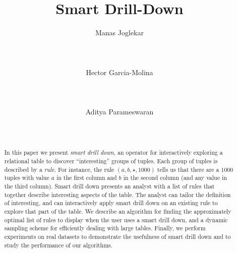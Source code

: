 \documentclass{vldb}
\newcommand{\techreporttext}[1]{}
\begin{document}
\title{Smart Drill-Down}
\author{
\alignauthor
Manas Joglekar\\
       \\
       \\
	   \\
\alignauthor
Hector Garcia-Molina\\
       \\
       \\
	   \\
\alignauthor 
Aditya Parameswaran\\
       \\
       \\
}
\maketitle

\begin{abstract}
In this paper we present {\em smart drill down},
an operator for interactively exploring a relational table
to discover ``interesting'' groups of tuples.
Each group of tuples is described by a {\em rule}.
For instance, the rule $(a, b, \star, 1000)$ tells us that
there are a $1000$ tuples with value $a$ in the first column and $b$
in the second column (and any value in the third column).
Smart drill down presents an analyst with a list of rules that
together describe interesting aspects of the table.
The analyst can tailor the definition of interesting,
and can interactively apply smart drill down on an existing rule to
explore that part of the table.
We describe an
algorithm for finding the approximately optimal list of rules to display when the user uses a smart drill down, and a dynamic sampling scheme for efficiently dealing with large tables. Finally, we
perform experiments on real datasets to demonstrate the usefulness of smart drill down and to study the performance of our algorithms.
\end{abstract}









\techreporttext{}





{\small

  
}


\techreporttext{}
\end{document}
